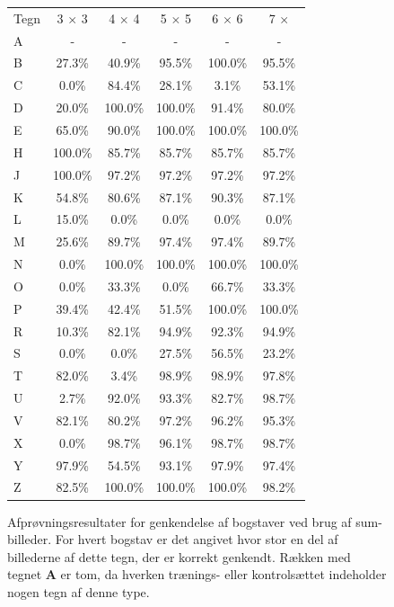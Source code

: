 \begin{figure}[htp]
\centering
\begin{tabular}{|l|c|c|c|c|c|}\hline
\rowcolor[gray]{0.9} \multicolumn{6}{|>{\columncolor[gray]{0.9}}c|}{\textbf{Genkendelse af bogstaver - Sum-billeder}} \\ \hline
Tegn & 3 $\times$ 3 & 4 $\times$ 4 & 5 $\times$ 5 & 6 $\times$ 6 & 7 $\times$ \\\hline
A & - & - & - & - & -\\\hline
B & 27.3\% & 40.9\% & 95.5\% & 100.0\% & 95.5\%\\\hline
C & 0.0\% & 84.4\% & 28.1\% & 3.1\% & 53.1\%\\\hline
D & 20.0\% & 100.0\% & 100.0\% & 91.4\% & 80.0\%\\\hline
E & 65.0\% & 90.0\% & 100.0\% & 100.0\% & 100.0\%\\\hline
H & 100.0\% & 85.7\% & 85.7\% & 85.7\% & 85.7\%\\\hline
J & 100.0\% & 97.2\% & 97.2\% & 97.2\% & 97.2\%\\\hline
K & 54.8\% & 80.6\% & 87.1\% & 90.3\% & 87.1\%\\\hline 
L & 15.0\% & 0.0\% & 0.0\% & 0.0\% & 0.0\%\\\hline
M & 25.6\% & 89.7\% & 97.4\% & 97.4\% & 89.7\%\\\hline
N & 0.0\% & 100.0\% & 100.0\% & 100.0\% & 100.0\%\\\hline
O & 0.0\% & 33.3\% & 0.0\% & 66.7\% & 33.3\%\\\hline
P & 39.4\% & 42.4\% & 51.5\% & 100.0\% & 100.0\%\\\hline
R & 10.3\% & 82.1\% & 94.9\% & 92.3\% & 94.9\%\\\hline
S & 0.0\% & 0.0\% & 27.5\% & 56.5\% & 23.2\%\\\hline
T & 82.0\% & 3.4\% & 98.9\% & 98.9\% & 97.8\%\\\hline
U & 2.7\% & 92.0\% & 93.3\% & 82.7\% & 98.7\%\\\hline
V & 82.1\% & 80.2\% & 97.2\% & 96.2\% & 95.3\%\\\hline
X & 0.0\% & 98.7\% & 96.1\% & 98.7\% & 98.7\%\\\hline
Y & 97.9\% & 54.5\% & 93.1\% & 97.9\% & 97.4\%\\\hline
Z & 82.5\% & 100.0\% & 100.0\% & 100.0\% & 98.2\%\\\hline
\end{tabular}
\caption{Afprøvningsresultater for genkendelse af bogstaver ved brug af sum-billeder. For hvert bogstav er det angivet hvor stor en del af billederne af dette tegn, der er korrekt genkendt. Rækken med tegnet \textbf{A} er tom, da hverken trænings- eller kontrolsættet indeholder nogen tegn af denne type.}
\label{fig:test:sum_bogstav}
\end{figure}

